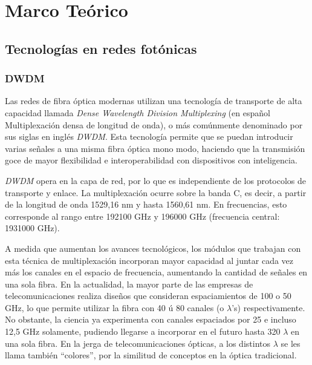 
\section{Marco Te\'orico}
\label{sec:marcoteorico}

\subsection{Tecnolog\'ias en redes fot\'onicas}
\label{sec:redfotonica}

\subsubsection{DWDM}
\label{sec:dwdm}

Las redes de fibra óptica modernas utilizan una tecnología de
transporte de alta capacidad llamada \emph{Dense Wavelength Division
  Multiplexing} (en español Multiplexación densa de longitud de onda),
o más comúnmente denominado por sus siglas en inglés \emph{DWDM}. Esta
tecnología permite que se puedan introducir varias señales a una misma
fibra óptica mono modo, haciendo que la transmisión goce de mayor
flexibilidad e interoperabilidad con dispositivos con inteligencia.

\emph{DWDM} opera en la capa de red, por lo que es independiente de
los protocolos de transporte y enlace. La multiplexación ocurre sobre
la banda C, es decir, a partir de la longitud de onda 1529,16 nm y
hasta 1560,61 nm. En frecuencias, esto corresponde al rango entre
192100 GHz y 196000 GHz (frecuencia central: 1931000 GHz).

A medida que aumentan los avances tecnológicos, los módulos que
trabajan con esta técnica de multiplexación incorporan mayor capacidad
al juntar cada vez más los canales en el espacio de frecuencia,
aumentando la cantidad de señales en una sola fibra. En la actualidad,
la mayor parte de las empresas de telecomunicaciones realiza diseños
que consideran espaciamientos de 100 o 50 GHz, lo que permite utilizar
la fibra con 40 ú 80 canales (o $\lambda$'s) respectivamente. No
obstante, la ciencia ya experimenta con canales espaciados por 25 e
incluso 12,5 GHz solamente, pudiendo llegarse a incorporar en el
futuro hasta 320 $\lambda$ en una sola fibra. En la jerga de
telecomunicaciones ópticas, a los distintos $\lambda$ se les llama
también ``colores'', por la similitud de conceptos en la óptica
tradicional.

